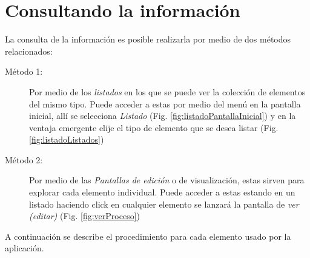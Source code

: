 \chapter{Consultando la informaci\'on}
\label{sec:consultandoLaInformacion}
La consulta de la informaci\'on es posible realizarla por medio de dos
m\'etodos relacionados:

\begin{description}
  \item[M\'etodo 1:]Por medio de los \emph{listados} en los que se puede ver la
  colecci\'on de elementos del mismo tipo.
  Puede acceder a estas por medio del men\'u \blackberry en
  la pantalla inicial, all\'i se selecciona \textit{Listado} (Fig.
\ref{fig:listadoPantallaInicial}) y en la ventaja emergente elije el tipo de
  elemento que se  desea listar (Fig. \ref{fig:listadoListados})
  \item[M\'etodo 2:]Por medio de las \emph{Pantallas de edici\'on} o de
  visualizaci\'on, estas sirven para explorar cada elemento individual.
  Puede acceder a estas estando en un listado haciendo click en cualquier
  elemento  se lanzar\'a la pantalla de \emph{ver (editar)} (Fig.
\ref{fig:verProceso})

\end{description}

A continuaci\'on se describe el procedimiento para cada elemento usado por la
aplicaci\'on.
















